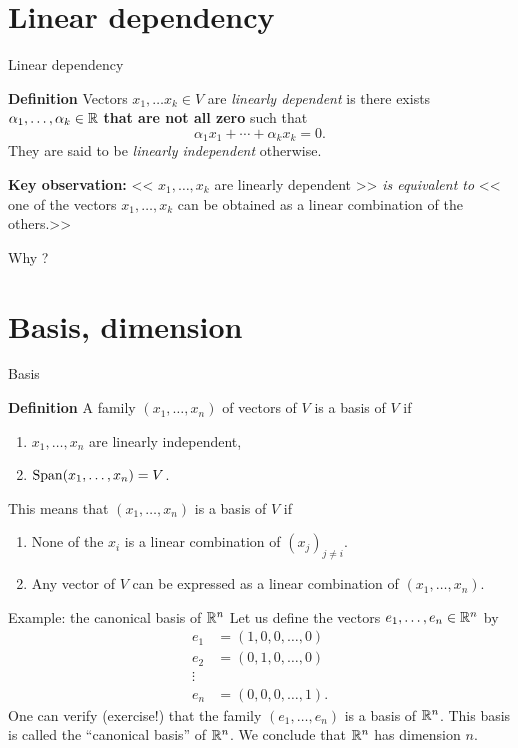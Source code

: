 \documentclass{beamer}
\begin{document}
\section{Linear dependency}

\begin{frame}[t]{Linear dependency}
	\begin{block}{\bf Definition}
		Vectors $x_1, \dots x_k \in V$ are \emph{linearly dependent} is there exists $\alpha_1, \dots, \alpha_k \in \mathbb{R}$ \textbf{that are not all zero} such that 
		$$
		\alpha_1 x_1 + \cdots + \alpha_k x_k = 0.
		$$
		They are said to be \emph{linearly independent} otherwise.
	\end{block}

	\vspace{0.5cm}

	\textbf{Key observation:}
<< $x_1, \dots, x_k$ are linearly dependent >>
\emph{is equivalent to}
<< one of the vectors $x_1, \dots, x_k$ can be obtained as a linear combination of the others.>>
\end{frame}
\begin{frame}[t]{Why ?}
\end{frame}

\section{Basis, dimension}

\begin{frame}[t]{Basis}
	\begin{block}{\bf Definition}
	A family $(x_1, \dots, x_n)$ of vectors of $V$ is a basis of $V$ if
	\begin{enumerate}
		\item $x_1, \dots, x_n$ are linearly independent,
		\item ${{\rm Span}}(x_1, \dots, x_n) = V$.
	\end{enumerate}
	\end{block}
	\vspace{0.5cm}
	This means that $(x_1, \dots, x_n)$ is a basis of $V$ if
	\begin{enumerate}
		\item None of the $x_i$ is a linear combination of $(x_j)_{j \neq i}$.
		\item Any vector of $V$ can be expressed as a linear combination of $(x_1, \dots, x_n)$.
	\end{enumerate}
\end{frame}

\begin{frame}{Example: the canonical basis of $\mathbb{R}^n$}
	Let us define the vectors $e_1, \dots, e_n \in \mathbb{R}^n$ by
	\begin{align*}
		e_1 &= (1, 0, 0, \dots, 0) \\
		e_2 &= (0, 1, 0, \dots, 0) \\
		\vdots & \\
		e_n &= (0, 0, 0, \dots, 1).
	\end{align*}
	One can verify (exercise!) that the family $(e_1, \dots, e_n)$ is a basis of $\mathbb{R}^n$. This basis is called the ``canonical basis'' of $\mathbb{R}^n$. We conclude that $\mathbb{R}^n$ has dimension $n$.
\end{frame}
\end{document}
